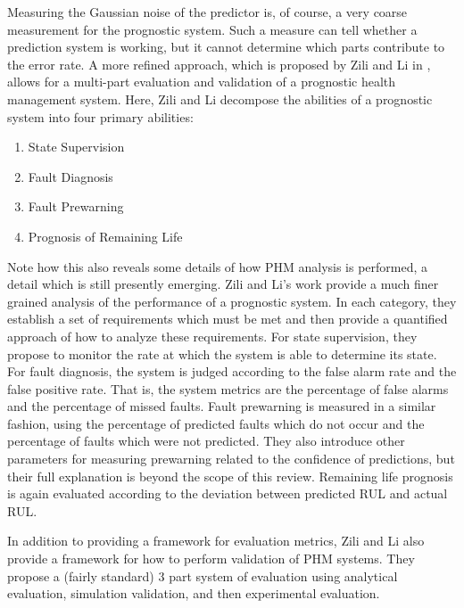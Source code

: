 \documentclass[12pt]{article}
\begin{document}
Measuring the Gaussian noise of the predictor is, of course, a very
coarse measurement for the prognostic system.  Such a measure can tell
whether a prediction system is working, but it cannot determine which
parts contribute to the error rate.  A more refined approach, which is
proposed by Zili and Li in \cite{5413560}, allows for a multi-part
evaluation and validation of a prognostic health management system.
Here, Zili and Li decompose the abilities of a prognostic system into
four primary abilities:
\begin{enumerate}
  \item State Supervision
  \item Fault Diagnosis
  \item Fault Prewarning
  \item Prognosis of Remaining Life
\end{enumerate}
Note how this also reveals some details of how PHM analysis is
performed, a detail which is still presently emerging.  Zili and Li's
work provide a much finer grained analysis of the performance of a
prognostic system.  In each category, they establish a set of
requirements which must be met and then provide a quantified approach
of how to analyze these requirements.  For state supervision, they
propose to monitor the rate at which the system is able to determine
its state.  For fault diagnosis, the system is judged according to the
false alarm rate and the false positive rate.  That is, the system
metrics are the percentage of false alarms and the percentage of
missed faults.  Fault prewarning is measured in a similar fashion,
using the percentage of predicted faults which do not occur and the
percentage of faults which were not predicted.  They also introduce
other parameters for measuring prewarning related to the confidence of
predictions, but their full explanation is beyond the scope of this
review.  Remaining life prognosis is again evaluated according to the
deviation between predicted RUL and actual RUL.

In addition to providing a framework for evaluation metrics, Zili and
Li also provide a framework for how to perform validation of PHM
systems.  They propose a (fairly standard) 3 part system of evaluation
using analytical evaluation, simulation validation, and then
experimental evaluation.
\end{document}

